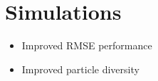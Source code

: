 \documentclass[journal]{IEEEtran}
\begin{document}
\section{Simulations}

\begin{itemize}
	\item Improved RMSE performance
	\item Improved particle diversity
\end{itemize}






%
%



%
%
\end{document}
